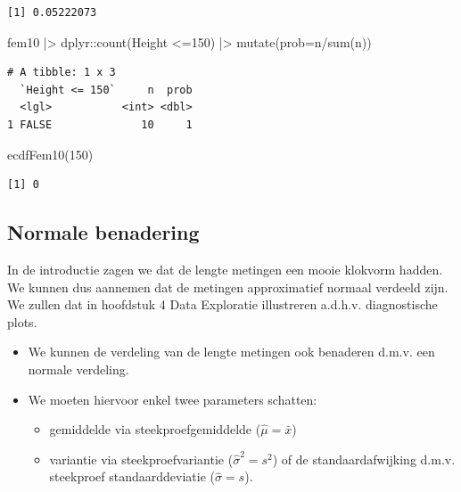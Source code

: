 \documentclass[
  dutch,
  letterpaper,
  12pt]{book}
\newenvironment{Shaded}{\begin{snugshade}}{\end{snugshade}}
\newcommand{\AttributeTok}[1]{\textcolor[rgb]{0.40,0.45,0.13}{#1}}
\newcommand{\DecValTok}[1]{\textcolor[rgb]{0.68,0.00,0.00}{#1}}
\newcommand{\FunctionTok}[1]{\textcolor[rgb]{0.28,0.35,0.67}{#1}}
\newcommand{\NormalTok}[1]{\textcolor[rgb]{0.00,0.23,0.31}{#1}}
\newcommand{\SpecialCharTok}[1]{\textcolor[rgb]{0.37,0.37,0.37}{#1}}
\providecommand{\tightlist}{%
  \setlength{\itemsep}{0pt}\setlength{\parskip}{0pt}}
\theoremstyle{definition}
\theoremstyle{definition}
\theoremstyle{definition}
\theoremstyle{remark}
\begin{document}
\begin{verbatim}
[1] 0.05222073
\end{verbatim}

\begin{Shaded}
\begin{Highlighting}[]
\NormalTok{fem10 }\SpecialCharTok{|\textgreater{}}
\NormalTok{  dplyr}\SpecialCharTok{::}\FunctionTok{count}\NormalTok{(Height }\SpecialCharTok{\textless{}=}\DecValTok{150}\NormalTok{) }\SpecialCharTok{|\textgreater{}}
  \FunctionTok{mutate}\NormalTok{(}\AttributeTok{prob=}\NormalTok{n}\SpecialCharTok{/}\FunctionTok{sum}\NormalTok{(n))}
\end{Highlighting}
\end{Shaded}

\begin{verbatim}
# A tibble: 1 x 3
  `Height <= 150`     n  prob
  <lgl>           <int> <dbl>
1 FALSE              10     1
\end{verbatim}

\begin{Shaded}
\begin{Highlighting}[]
\FunctionTok{ecdfFem10}\NormalTok{(}\DecValTok{150}\NormalTok{)}
\end{Highlighting}
\end{Shaded}

\begin{verbatim}
[1] 0
\end{verbatim}

\subsection{Normale benadering}\label{normale-benadering}

In de introductie zagen we dat de lengte metingen een mooie klokvorm
hadden. We kunnen dus aannemen dat de metingen approximatief normaal
verdeeld zijn. We zullen dat in hoofdstuk 4 Data Exploratie illustreren
a.d.h.v. diagnostische plots.

\begin{itemize}
\item
  We kunnen de verdeling van de lengte metingen ook benaderen d.m.v. een
  normale verdeling.
\item
  We moeten hiervoor enkel twee parameters schatten:

  \begin{itemize}
  \tightlist
  \item
    gemiddelde via steekproefgemiddelde (\(\hat\mu=\bar x\))
  \item
    variantie via steekproefvariantie (\(\hat{\sigma}^2= s^2\)) of de
    standaardafwijking d.m.v. steekproef standaarddeviatie
    (\(\hat\sigma=s\)).
  \end{itemize}
\end{itemize}
\end{document}
